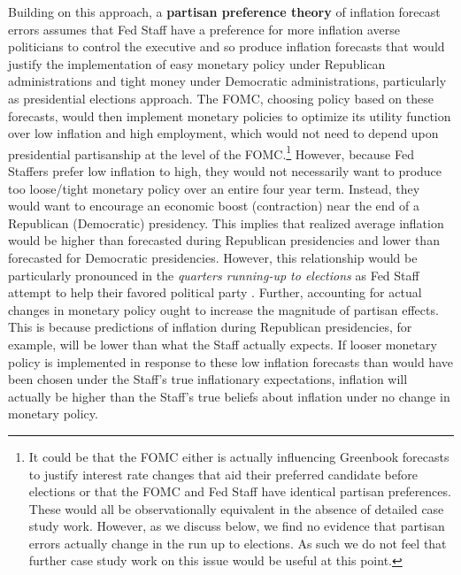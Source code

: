 \documentclass[a4paper]{article}
\begin{document}
Building on this approach, a {\bf{partisan preference theory}} of inflation forecast errors assumes that Fed Staff have a preference for more inflation averse politicians to control the executive and so produce inflation forecasts that would justify the implementation of easy monetary policy under Republican administrations and tight money under Democratic administrations, particularly as presidential elections approach. The FOMC, choosing policy based on these forecasts, would then implement monetary policies to optimize its utility function over low inflation and high employment, which would not need to depend upon presidential partisanship at the level of the FOMC.\footnote{It could be that the FOMC either is actually influencing Greenbook forecasts to justify interest rate changes that aid their preferred candidate before elections or that the FOMC and Fed Staff have identical partisan preferences. These would all be observationally equivalent in the absence of detailed case study work. However, as we discuss below, we find no evidence that partisan errors actually change in the run up to elections. As such we do not feel that further case study work on this issue would be useful at this point.} However, because Fed Staffers prefer low inflation to high, they would not necessarily want to produce too loose/tight monetary policy over an entire four year term. Instead, they would want to encourage an economic boost (contraction) near the end of a Republican (Democratic) presidency. This implies that realized average inflation would be higher than forecasted during Republican presidencies and lower than forecasted for Democratic presidencies. However, this relationship would be particularly pronounced in the {\emph{quarters running-up to elections}} as Fed Staff attempt to help their favored political party \citep{Beck1987,Grier1987}. Further, accounting for actual changes in monetary policy ought to increase the magnitude of partisan effects. This is because predictions of inflation during Republican presidencies, for example, will be lower than what the Staff actually expects. If looser monetary policy is implemented in response to these low inflation forecasts than would have been chosen under the Staff's true inflationary expectations, inflation will actually be higher than the Staff's true beliefs about inflation under no change in monetary policy.
\end{document}
